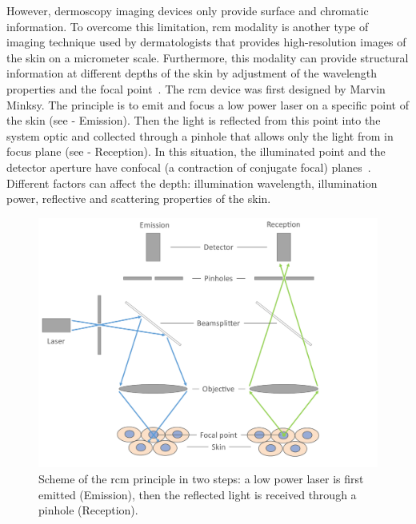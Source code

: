\documentclass[journal,article,accept,moreauthors,pdftex, applsci]{Definitions/mdpi}
\begin{document}
However, dermoscopy imaging devices only provide surface and chromatic information. To overcome this limitation, \ac{rcm} modality is another type of imaging technique used by dermatologists that provides high-resolution images of the skin on a micrometer scale. Furthermore, this modality can provide structural information at different depths of the skin by adjustment of the wavelength properties and the focal point~\cite{Kolm2012}. The \ac{rcm} device was first designed by Marvin Minksy. The principle is to emit and focus a low power laser on a specific point of the skin (see  - Emission). Then the light is reflected from this point into the system optic and collected through a pinhole that allows only the light from in focus plane (see  - Reception). In this situation, the illuminated point and the detector aperture have confocal (a contraction of conjugate focal) planes~\cite{Nehal2008a}. Different factors can affect the depth: illumination wavelength, illumination power, reflective and scattering properties of the skin.\par

\begin{figure}[H]
    \begin{center}
        \includegraphics[width=0.7\linewidth]{Figures/RCM.pdf}
        \caption{Scheme of the \ac{rcm} principle in two steps: a low power laser is first emitted (Emission), then the reflected light is received through a pinhole (Reception).}
        \label{fig:rcm}
    \end{center} 
\end{figure}\par
\end{document}
